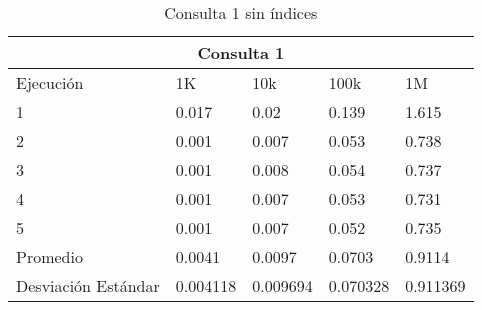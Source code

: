 \begin{table}%
\begin{center}%
\setlength{\tabcolsep}{0.3in}%
\begin{tabular}{|l|l|l|l|l|}%
\hline%
\multicolumn{5}{|c|}{Consulta 1}\\%
\hline%
Ejecución&1K&10k&100k&1M\\%
\hline%
1&0.017&0.02&0.139&1.615\\%
\hline%
2&0.001&0.007&0.053&0.738\\%
\hline%
3&0.001&0.008&0.054&0.737\\%
\hline%
4&0.001&0.007&0.053&0.731\\%
\hline%
5&0.001&0.007&0.052&0.735\\%
\hline%
Promedio&0.0041&0.0097&0.0703&0.9114\\%
\hline%
Desviación Estándar&0.004118&0.009694&0.070328&0.911369\\%
\hline%
\end{tabular}%
\end{center}%
\caption{Consulta 1 sin índices}%
\end{table}